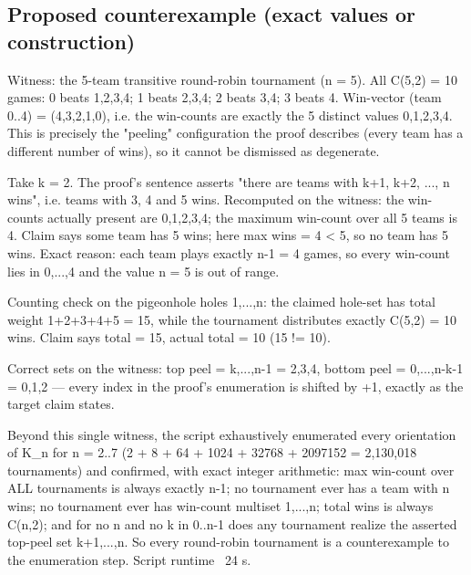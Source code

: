 \documentclass[11pt]{article}
\begin{document}
\subsection*{Proposed counterexample (exact values or construction)}
\begin{Vsrc}
Witness: the 5-team transitive round-robin tournament (n = 5). All C(5,2) = 10 games: 0 beats 1,2,3,4; 1 beats 2,3,4; 2 beats 3,4; 3 beats 4. Win-vector (team 0..4) = (4,3,2,1,0), i.e. the win-counts are exactly the 5 distinct values {0,1,2,3,4}. This is precisely the "peeling" configuration the proof describes (every team has a different number of wins), so it cannot be dismissed as degenerate.

Take k = 2. The proof's sentence asserts "there are teams with k+1, k+2, ..., n wins", i.e. teams with 3, 4 and 5 wins. Recomputed on the witness: the win-counts actually present are {0,1,2,3,4}; the maximum win-count over all 5 teams is 4. Claim says some team has 5 wins; here max wins = 4 < 5, so no team has 5 wins. Exact reason: each team plays exactly n-1 = 4 games, so every win-count lies in {0,...,4} and the value n = 5 is out of range.

Counting check on the pigeonhole holes {1,...,n}: the claimed hole-set has total weight 1+2+3+4+5 = 15, while the tournament distributes exactly C(5,2) = 10 wins. Claim says total = 15, actual total = 10 (15 != 10).

Correct sets on the witness: top peel = {k,...,n-1} = {2,3,4}, bottom peel = {0,...,n-k-1} = {0,1,2} — every index in the proof's enumeration is shifted by +1, exactly as the target claim states.

Beyond this single witness, the script exhaustively enumerated every orientation of K_n for n = 2..7 (2 + 8 + 64 + 1024 + 32768 + 2097152 = 2,130,018 tournaments) and confirmed, with exact integer arithmetic: max win-count over ALL tournaments is always exactly n-1; no tournament ever has a team with n wins; no tournament ever has win-count multiset {1,...,n}; total wins is always C(n,2); and for no n and no k in 0..n-1 does any tournament realize the asserted top-peel set {k+1,...,n}. So every round-robin tournament is a counterexample to the enumeration step. Script runtime ~24 s.
\end{Vsrc}
\end{document}
